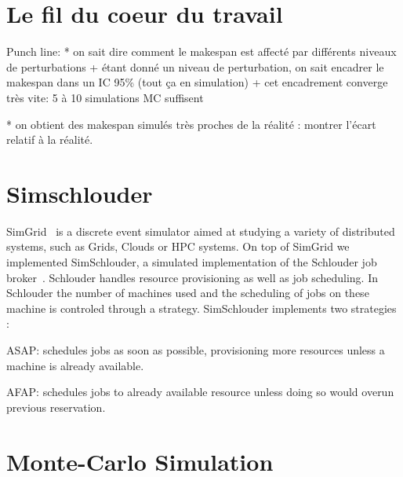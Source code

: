 \documentclass[10pt,conference,compsocconf]{IEEEtran}
\begin{document}
\section{Le fil du coeur du travail}
Punch line:
*  on sait dire comment le makespan est affecté par différents niveaux de
perturbations 
    + étant donné un niveau de perturbation, on sait encadrer le
      makespan dans un IC 95\% (tout ça en simulation)
    + cet encadrement converge très vite: 5 à 10 simulations MC suffisent

* on obtient des makespan simulés très proches de la réalité : montrer l'écart
relatif à la réalité. 
\section{Simschlouder}

SimGrid~\cite{simgrid} is a discrete event simulator aimed at studying a variety
of distributed systems, such as Grids, Clouds  or HPC systems. On top of SimGrid
we implemented  SimSchlouder, a  simulated implementation  of the  Schlouder job
broker~\cite{Michon17}.  Schlouder handles resource  provisioning as well  as job
scheduling. In Schlouder the number of  machines used and the scheduling of jobs
on these  machine is controled  through a strategy. SimSchlouder  implements two
strategies :
\begin{description}
\item  ASAP: schedules  jobs as  soon as  possible, provisioning  more resources
  unless a machine is already available.
\item AFAP: schedules  jobs to already available resource  unless doing so
      would overun previous reservation.
\end{description}

\section{Monte-Carlo Simulation}
\end{document}
